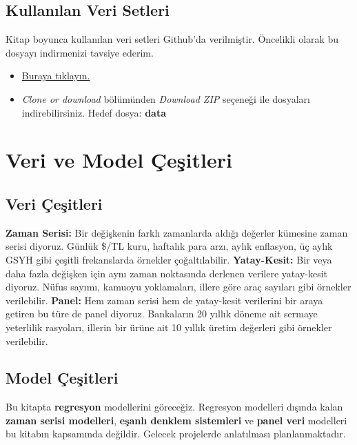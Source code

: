 \documentclass[
]{book}
\begin{document}
\hypertarget{kullanux131lan-veri-setleri}{%
\section{Kullanılan Veri Setleri}\label{kullanux131lan-veri-setleri}}

Kitap boyunca kullanılan veri setleri Github'da verilmiştir. Öncelikli olarak bu dosyayı indirmenizi tavsiye ederim.

\begin{itemize}
\item
  \href{https://github.com/rpydaneogrendim/rEkonometri}{Buraya tıklayın.}
\item
  \emph{Clone or download} bölümünden \emph{Download ZIP} seçeneği ile dosyaları indirebilirsiniz. Hedef dosya: \textbf{data}
\end{itemize}

\hypertarget{veri-ve-model-uxe7eux15fitleri}{%
\chapter{Veri ve Model Çeşitleri}\label{veri-ve-model-uxe7eux15fitleri}}

\hypertarget{veri-uxe7eux15fitleri}{%
\section{Veri Çeşitleri}\label{veri-uxe7eux15fitleri}}

\textbf{Zaman Serisi:} Bir değişkenin farklı zamanlarda aldığı değerler kümesine zaman serisi diyoruz. Günlük \$/TL kuru, haftalık para arzı, aylık enflasyon, üç aylık GSYH gibi çeşitli frekanslarda örnekler çoğaltılabilir. \textbf{Yatay-Kesit:} Bir veya daha fazla değişken için aynı zaman noktasında derlenen verilere yatay-kesit diyoruz. Nüfus sayımı, kamuoyu yoklamaları, illere göre araç sayıları gibi örnekler verilebilir. \textbf{Panel:} Hem zaman serisi hem de yatay-kesit verilerini bir araya getiren bu türe de panel diyoruz. Bankaların 20 yıllık döneme ait sermaye yeterlilik rasyoları, illerin bir ürüne ait 10 yıllık üretim değerleri gibi örnekler verilebilir.

\hypertarget{model-uxe7eux15fitleri}{%
\section{Model Çeşitleri}\label{model-uxe7eux15fitleri}}

Bu kitapta \textbf{regresyon} modellerini göreceğiz. Regresyon modelleri dışında kalan \textbf{zaman serisi modelleri}, \textbf{eşanlı denklem sistemleri} ve \textbf{panel veri} modelleri bu kitabın kapsamında değildir. Gelecek projelerde anlatılması planlanmaktadır.
\end{document}
